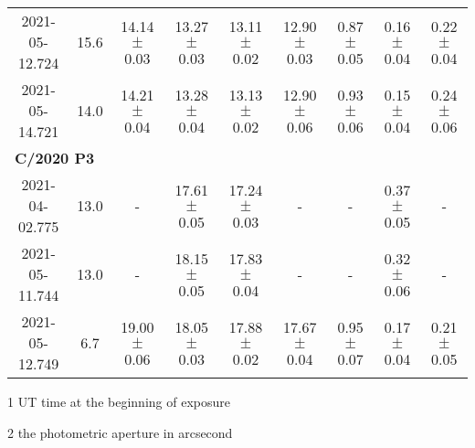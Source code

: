 \begin{table}[!htbp]
\begin{threeparttable}
{\begin{tabular}{ccccccccc}
            2021-05-12.724 & 15.6 & 14.14 $\pm$ 0.03 & 13.27 $\pm$ 0.03 & 13.11 $\pm$ 0.02 & 12.90 $\pm$ 0.03 & 0.87 $\pm$ 0.05 & 0.16 $\pm$ 0.04 & 0.22 $\pm$ 0.04 \\
            2021-05-14.721 & 14.0 & 14.21 $\pm$ 0.04 & 13.28 $\pm$ 0.04 & 13.13 $\pm$ 0.02 & 12.90 $\pm$ 0.06 & 0.93 $\pm$ 0.06 & 0.15 $\pm$ 0.04 & 0.24 $\pm$ 0.06 \\
            \multicolumn{9}{l}{\textbf{C/2020 P3}} \\
            2021-04-02.775 & 13.0 & - & 17.61 $\pm$ 0.05 & 17.24 $\pm$ 0.03 & - & - & 0.37 $\pm$ 0.05 & - \\
            2021-05-11.744 & 13.0 & - & 18.15 $\pm$ 0.05 & 17.83 $\pm$ 0.04 & - & - & 0.32 $\pm$ 0.06 & - \\
            2021-05-12.749 & 6.7 & 19.00 $\pm$ 0.06 & 18.05 $\pm$ 0.03 & 17.88 $\pm$ 0.02 & 17.67 $\pm$ 0.04 & 0.95 $\pm$ 0.07 & 0.17 $\pm$ 0.04 & 0.21 $\pm$ 0.05 \\
            \bottomrule
        \end{tabular}
        }
        \begin{tablenotes}
            \item[1] UT time at the beginning of exposure
            \item[2] the photometric aperture in arcsecond
        \end{tablenotes}
    \end{threeparttable}
\end{table}

